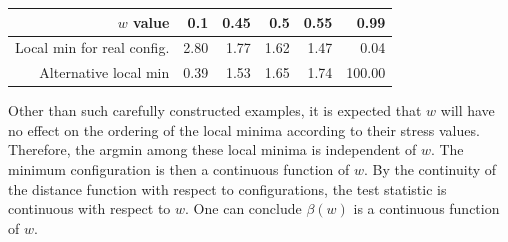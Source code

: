 \documentclass[11pt]{article} %
\begin{document}
\begin{table}[ht]
\begin{center}
\begin{tabular}{rrrrrr}
  \hline
 $w$ value & 0.1 & 0.45 & 0.5 & 0.55 & 0.99 \\ 
  \hline
Local min for real config. & 2.80 & 1.77 & 1.62 & 1.47 & 0.04 \\ 
  Alternative local min & 0.39 & 1.53 & 1.65 & 1.74 & 100.00 \\ 
   \hline
\end{tabular}
\end{center}
\end{table}


Other than such carefully constructed examples, it is  expected that $w$  will have no effect on the ordering of the local minima according to their stress values.
Therefore,  the argmin among these local minima is independent of $w$. The minimum configuration is then a continuous function of $w$. 
By the continuity of the distance function with respect to configurations, the test statistic is continuous with respect to $w$. One can conclude $\beta(w) $ is a continuous function of $w$. 

 
\end{document}
